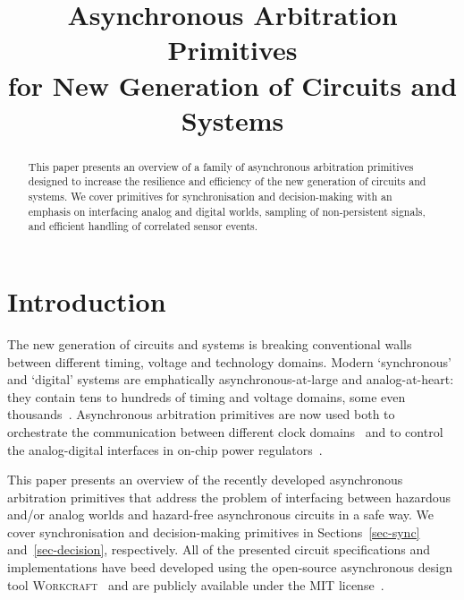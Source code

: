 \documentclass[conference]{IEEEtran}
\begin{document}
\title{Asynchronous Arbitration Primitives\\for New Generation of Circuits and Systems}

\author{
}

\maketitle

\begin{abstract}
This paper presents an overview of a family of asynchronous arbitration primitives designed
to increase the resilience and efficiency of the new generation of circuits and systems.
We cover primitives for synchronisation and decision-making with an emphasis on interfacing
analog and digital worlds, sampling of non-persistent signals, and efficient handling of
correlated sensor events.
\end{abstract}


\section{Introduction}

The new generation of circuits and systems is breaking conventional walls between
different timing, voltage and technology domains. Modern `synchronous' and `digital'
systems are emphatically asynchronous-at-large and analog-at-heart: they contain tens
to hundreds of timing and voltage domains, some even thousands~\cite{2017_bohnenstiehl_kilocore}.
Asynchronous arbitration primitives are now used both to orchestrate the communication
between different clock domains~\cite{2017_jiang_noc} and to control the analog-digital
interfaces in on-chip power regulators~\cite{2017_sokolov_a4a}.


This paper presents an overview of the recently developed asynchronous arbitration
primitives that address the problem of interfacing between hazardous and/or analog
worlds and hazard-free asynchronous circuits in a safe way. We cover synchronisation and
decision-making primitives in Sections~\ref{sec-sync} and~\ref{sec-decision}, respectively.
All of the presented circuit specifications and implementations have beed developed using
the open-source asynchronous design tool \textsc{Workcraft}~\cite{Workcraft_website} and are
publicly available under the MIT license~\cite{Arbitration_primitives_github}.
\end{document}
